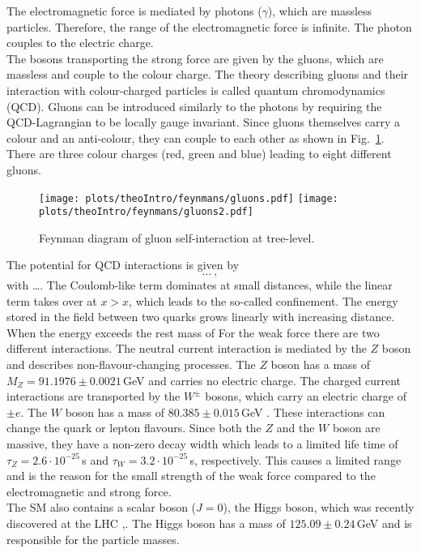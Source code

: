 The electromagnetic force is mediated by photons ($\gamma$), which are massless particles. Therefore, the range of the electromagnetic force is infinite. The photon couples to the electric charge.\\



The bosons transporting the strong force are given by the gluons, which are massless and couple to the colour charge. The theory describing gluons and their interaction with colour-charged particles is called quantum chromodynamics (QCD). Gluons can be introduced similarly to the photons by requiring the QCD-Lagrangian to be locally gauge invariant. Since gluons themselves carry a colour and an anti-colour, they can couple to each other as shown in Fig.~\ref{fig:theo:gluoncoupling}. There are three colour charges (red, green and blue) leading to eight different gluons.\\
\begin{figure}
	\centering
	\texttt{[image: plots/theoIntro/feynmans/gluons.pdf]}
	\texttt{[image: plots/theoIntro/feynmans/gluons2.pdf]}
	\caption[Feynman diagram of gluon self-interaction at tree-level]{Feynman diagram of gluon self-interaction at tree-level.}
	\label{fig:theo:gluoncoupling}
\end{figure}
The potential for QCD interactions is given by
\begin{equation}
\dots ~,
\end{equation}
with \dots . The Coulomb-like term dominates at small distances, while the linear term takes over at $x>x$, which leads to the so-called confinement. The energy stored in the field between two quarks grows linearly with increasing distance. When the energy exceeds the rest mass of  
For the weak force there are two different interactions. The neutral current interaction is mediated by the $Z$ boson and describes non-flavour-changing processes. The $Z$ boson has a mass of $M_Z=91.1976 \pm 0.0021$\,GeV \cite{SMmasses} and carries no electric charge. The charged current interactions are transported by the $W^\pm$ bosons, which carry an electric charge of $\pm e$. The $W$ boson has a mass of $80.385 \pm 0.015$\,GeV \cite{SMmasses}. These interactions can change the quark or lepton flavours. Since both the $Z$ and the $W$ boson are massive, they have a non-zero decay width which leads to a limited life time of $\tau_Z=2.6\cdot 10^{-25}$\,s and $\tau_W=3.2\cdot 10^{-25}$\,s, respectively. This causes a limited range and is the reason for the small strength of the weak force compared to the electromagnetic and strong force.\\ 
The SM also contains a scalar boson ($J=0$), the Higgs boson, which was recently discovered at the LHC \cite{cms_higgsdiscov},\cite{atlas_higgsdiscov}. The Higgs boson has a mass of $125.09 \pm 0.24$\,GeV and is responsible for the particle masses.\\






